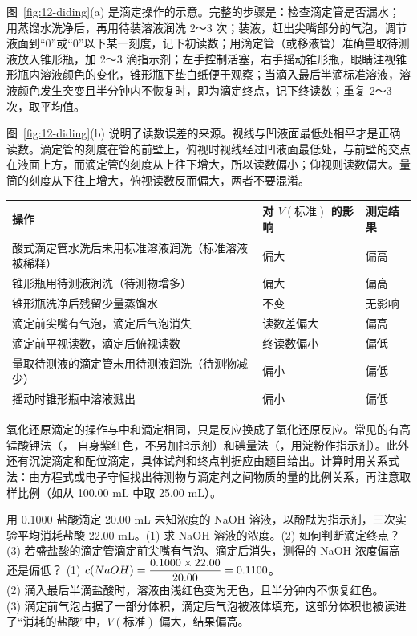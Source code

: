 图~\ref{fig:12-diding}(a) 是滴定操作的示意。完整的步骤是：检查滴定管是否漏水；用蒸馏水洗净后，再用待装溶液润洗 2～3 次；装液，赶出尖嘴部分的气泡，调节液面到“0”或“0”以下某一刻度，记下初读数；用滴定管（或移液管）准确量取待测液放入锥形瓶，加 2～3 滴指示剂；左手控制活塞，右手摇动锥形瓶，眼睛注视锥形瓶内溶液颜色的变化，锥形瓶下垫白纸便于观察；当滴入最后半滴标准溶液，溶液颜色发生突变且半分钟内不恢复时，即为滴定终点，记下终读数；重复 2～3 次，取平均值。

图~\ref{fig:12-diding}(b) 说明了读数误差的来源。视线与凹液面最低处相平才是正确读数。滴定管的刻度在管的前壁上，俯视时视线经过凹液面最低处，与前壁的交点在液面上方，而滴定管的刻度从上往下增大，所以读数偏小；仰视则读数偏大。量筒的刻度从下往上增大，俯视读数反而偏大，两者不要混淆。

\begin{center}
\small
\begin{tabularx}{\linewidth}{Xp{3.4cm}p{1.6cm}}
\toprule
操作 & 对 $V(\text{标准})$ 的影响 & 测定结果 \\
\midrule
酸式滴定管水洗后未用标准溶液润洗（标准溶液被稀释） & 偏大 & 偏高 \\
锥形瓶用待测液润洗（待测物增多） & 偏大 & 偏高 \\
锥形瓶洗净后残留少量蒸馏水 & 不变 & 无影响 \\
滴定前尖嘴有气泡，滴定后气泡消失 & 读数差偏大 & 偏高 \\
滴定前平视读数，滴定后俯视读数 & 终读数偏小 & 偏低 \\
量取待测液的滴定管未用待测液润洗（待测物减少） & 偏小 & 偏低 \\
摇动时锥形瓶中溶液溅出 & 偏小 & 偏低 \\
\bottomrule
\end{tabularx}
\end{center}

氧化还原滴定的操作与中和滴定相同，只是反应换成了氧化还原反应。常见的有高锰酸钾法（， 自身紫红色，不另加指示剂）和碘量法（，用淀粉作指示剂）。此外还有沉淀滴定和配位滴定，具体试剂和终点判据应由题目给出。计算时用关系式法：由方程式或电子守恒找出待测物与滴定剂之间物质的量的比例关系，再注意取样比例（如从 100.00 mL 中取 25.00 mL）。

\begin{liti}[基础]
用 0.1000\molL{} 盐酸滴定 20.00 mL 未知浓度的 NaOH 溶液，以酚酞为指示剂，三次实验平均消耗盐酸 22.00 mL。(1) 求 NaOH 溶液的浓度。(2) 如何判断滴定终点？(3) 若盛盐酸的滴定管滴定前尖嘴有气泡、滴定后消失，测得的 NaOH 浓度偏高还是偏低？
\tcblower
\jie (1) $c(NaOH)=\dfrac{0.1000\times22.00}{20.00}=0.1100$\molL。\\
(2) 滴入最后半滴盐酸时，溶液由浅红色变为无色，且半分钟内不恢复红色。\\
(3) 滴定前气泡占据了一部分体积，滴定后气泡被液体填充，这部分体积也被读进了“消耗的盐酸”中，$V(\text{标准})$ 偏大，结果偏高。
\end{liti}

